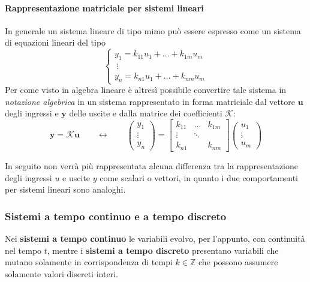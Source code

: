     	\paragraph{Rappresentazione matriciale per sistemi lineari} In generale un sistema lineare di tipo mimo può essere espresso come un sistema di equazioni lineari del tipo
    	\[\begin{cases}
    		y_1 = k_{11} u_1 + \dots + k_{1m} u_m \\
    		\ \vdots \\ 
    		y_n = k_{n1} u_1 + \dots + k_{nm} u_m
    	\end{cases}\]
    	Per come visto in algebra lineare è altresì possibile convertire tale sistema in \textit{notazione algebrica} in un sistema rappresentato in forma matriciale dal vettore $\boldsymbol u$ degli ingressi e $\boldsymbol y$ delle uscite e dalla matrice dei coefficienti $\mathcal K$:
    	\[ \boldsymbol{y} = \mathcal K \boldsymbol{u} \qquad \leftrightarrow\qquad \begin{pmatrix}
    		y_1 \\ \vdots \\ y_n
    	\end{pmatrix} = \begin{bmatrix}
    		k_{11} & \dots & k_{1m} \\ 
    		\vdots & \ddots \\
    		k_{n1} & & k_{nm}
    	\end{bmatrix} \begin{pmatrix}
    		u_1 \\ \vdots \\ u_m
    	\end{pmatrix}\]
    	\begin{osservazione}
    		In seguito non verrà più rappresentata alcuna differenza tra la rappresentazione degli ingressi $u$ e uscite $y$ come scalari o vettori, in quanto i due comportamenti per sistemi lineari sono analoghi.
    	\end{osservazione}
    	
    \subsubsection{Sistemi a tempo continuo e a tempo discreto}
    	Nei \textbf{sistemi a tempo continuo} le variabili evolvo, per l'appunto, con continuità nel tempo $t$, mentre i \textbf{sistemi a tempo discreto} presentano variabili che mutano solamente in corrispondenza di tempi $k\in \mathds Z$ che possono assumere solamente valori discreti interi.
    	
